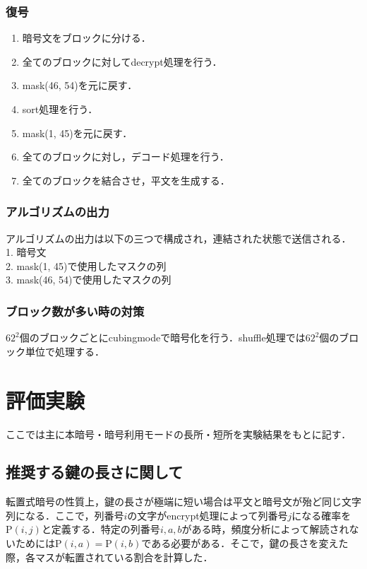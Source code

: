\documentclass[titlepage]{jarticle}
\begin{document}
\subsubsection{復号}
\begin{enumerate}
\item 暗号文をブロックに分ける．
\item 全てのブロックに対してdecrypt処理を行う．
\item mask(46, 54)を元に戻す．
\item sort処理を行う．
\item mask(1, 45)を元に戻す．
\item 全てのブロックに対し，デコード処理を行う．
\item 全てのブロックを結合させ，平文を生成する．
\end{enumerate}

\subsubsection{アルゴリズムの出力}
アルゴリズムの出力は以下の三つで構成され，連結された状態で送信される．\\
1. 暗号文\\
2. mask(1, 45)で使用したマスクの列\\
3. mask(46, 54)で使用したマスクの列\\

\subsubsection{ブロック数が多い時の対策}
\(62^2\)個のブロックごとにcubingmodeで暗号化を行う．shuffle処理では\(62^2\)個のブロック単位で処理する．

\section{評価実験}
ここでは主に本暗号・暗号利用モードの長所・短所を実験結果をもとに記す．
\subsection{推奨する鍵の長さに関して}
転置式暗号の性質上，鍵の長さが極端に短い場合は平文と暗号文が殆ど同じ文字列になる．ここで，列番号\(i\)の文字がencrypt処理によって列番号\(j\)になる確率を\(\mathrm{P}(i,j)\)と定義する．特定の列番号\(i,a,b\)がある時，頻度分析によって解読されないためには\(\mathrm{P}(i,a)=\mathrm{P}(i,b)\)である必要がある．そこで，鍵の長さを変えた際，各マスが転置されている割合を計算した．\\
\end{document}
